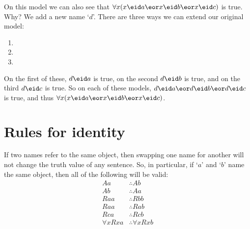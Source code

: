 On this model we can also see that $\forall x(x\eid a\eor x\eid b\eor x\eid c)$ is true. Why? We add a new name `$d$'. There are three ways we can extend our original model:\begin{enumerate}
\item
{}
\item
{}
\item
{}
\end{enumerate}
On the first of these, $d\eid a$ is true, on the second $d\eid b$ is true, and on the third $d\eid c$ is true. So on each of these models, $d\eid a\eor d\eid b\eor d\eid c$ is true, and thus $\forall x(x\eid a\eor x\eid b\eor x\eid c)$.



%



\chapter{Rules for identity}
If two names refer to the same object, then swapping one name for another will not change the truth value of any sentence. So, in particular, if `$a$' and `$b$' name the same object, then all of the following will be valid:\label{model:nonidentity}
	\begin{align*}
	 	Aa &\therefore Ab \\
	 	Ab &\therefore Aa \\
	 	Raa &\therefore Rbb\\
		Raa & \therefore Rab\\
		Rca &\therefore Rcb\\
		\forall x Rxa &\therefore \forall x Rxb
	\end{align*}

